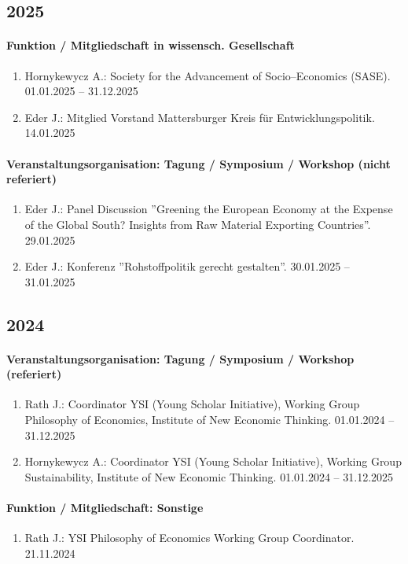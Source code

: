 \subsection*{2025}\paragraph{Funktion / Mitgliedschaft in wissensch. Gesellschaft}
\begin{enumerate}[leftmargin=*, labelsep=0.5cm]
\item Hornykewycz A.: Society for the Advancement of Socio--Economics (SASE). 01.01.2025 -- 31.12.2025
\item Eder J.: Mitglied Vorstand Mattersburger Kreis für Entwicklungspolitik. 14.01.2025
\end{enumerate}
\paragraph{Veranstaltungsorganisation: Tagung / Symposium / Workshop (nicht referiert)}
\begin{enumerate}[leftmargin=*, labelsep=0.5cm]
\item Eder J.: Panel Discussion ''Greening the European Economy at the Expense of the Global South? Insights from Raw Material Exporting Countries''. 29.01.2025
\item Eder J.: Konferenz ''Rohstoffpolitik gerecht gestalten''. 30.01.2025 -- 31.01.2025
\end{enumerate}\subsection*{2024}\paragraph{Veranstaltungsorganisation: Tagung / Symposium / Workshop (referiert)}
\begin{enumerate}[leftmargin=*, labelsep=0.5cm]
\item Rath J.: Coordinator YSI (Young Scholar Initiative), Working Group Philosophy of Economics,  Institute of New Economic Thinking. 01.01.2024 -- 31.12.2025
\item Hornykewycz A.: Coordinator YSI (Young Scholar Initiative), Working Group Sustainability, Institute of New Economic Thinking. 01.01.2024 -- 31.12.2025
\end{enumerate}
\paragraph{Funktion / Mitgliedschaft: Sonstige}
\begin{enumerate}[leftmargin=*, labelsep=0.5cm]
\item Rath J.: YSI Philosophy of Economics Working Group Coordinator. 21.11.2024
\end{enumerate}
